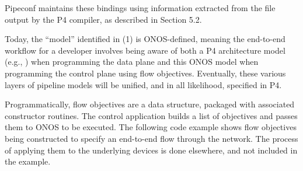 \documentclass[letterpaper,11pt,english]{sphinxmanual}
\begin{document}
Pipeconf maintains these bindings using information extracted from the
 file output by the P4 compiler, as described in Section
5.2.

Today, the “model” identified in (1) is ONOS-defined, meaning the
end-to-end workflow for a developer involves being aware of both a P4
architecture model (e.g., ) when programming the data
plane and this ONOS model when programming the control plane using
flow objectives. Eventually, these various layers of pipeline models
will be unified, and in all likelihood, specified in P4.

Programmatically, flow objectives are a data structure, packaged with
associated constructor routines. The control application builds a list
of objectives and passes them to ONOS to be executed. The following
code example shows flow objectives being constructed to specify an
end-to-end flow through the network. The process of applying them to
the underlying devices is done elsewhere, and not included in the
example.
\end{document}
